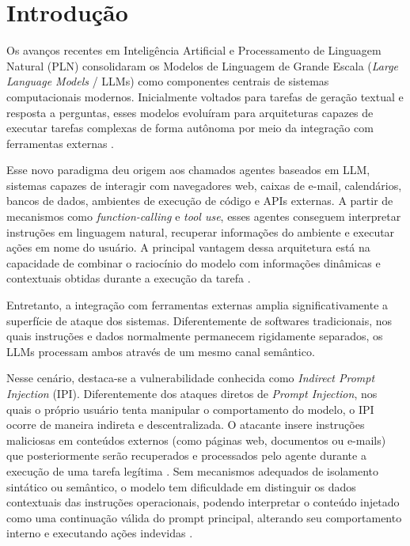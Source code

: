 \chapter{Introdução}\label{chp:INTRODUCAO}

Os avanços recentes em Inteligência Artificial e Processamento de Linguagem Natural (PLN) consolidaram os Modelos de Linguagem de Grande Escala (\textit{Large Language Models} / LLMs) como componentes centrais de sistemas computacionais modernos. Inicialmente voltados para tarefas de geração textual e resposta a perguntas, esses modelos evoluíram para arquiteturas capazes de executar tarefas complexas de forma autônoma por meio da integração com ferramentas externas \cite{debenedetti2024agentdojynamicenvironmentevaluate,ba2026cibercomprehensivebenchmarksecurity}.

Esse novo paradigma deu origem aos chamados agentes baseados em LLM, sistemas capazes de interagir com navegadores web, caixas de e-mail, calendários, bancos de dados, ambientes de execução de código e APIs externas. A partir de mecanismos como \textit{function-calling} e \textit{tool use}, esses agentes conseguem interpretar instruções em linguagem natural, recuperar informações do ambiente e executar ações em nome do usuário. A principal vantagem dessa arquitetura está na capacidade de combinar o raciocínio do modelo com informações dinâmicas e contextuais obtidas durante a execução da tarefa \cite{ferrag2025promptinjectionsprotocolexploits}.

Entretanto, a integração com ferramentas externas amplia significativamente a superfície de ataque dos sistemas. Diferentemente de softwares tradicionais, nos quais instruções e dados normalmente permanecem rigidamente separados, os LLMs processam ambos através de um mesmo canal semântico.

Nesse cenário, destaca-se a vulnerabilidade conhecida como \textit{Indirect Prompt Injection} (IPI). Diferentemente dos ataques diretos de \textit{Prompt Injection}, nos quais o próprio usuário tenta manipular o comportamento do modelo, o IPI ocorre de maneira indireta e descentralizada. O atacante insere instruções maliciosas em conteúdos externos (como páginas web, documentos ou e-mails) que posteriormente serão recuperados e processados pelo agente durante a execução de uma tarefa legítima \cite{greshake2023youvesignedforcompromising,dziemian2026vulnerableaiagentsindirect}. Sem mecanismos adequados de isolamento sintático ou semântico, o modelo tem dificuldade em distinguir os dados contextuais das instruções operacionais, podendo interpretar o conteúdo injetado como uma continuação válida do prompt principal, alterando seu comportamento interno e executando ações indevidas \cite{ferrag2025promptinjectionsprotocolexploits,wallace2024instructionhierarchytrainingllms}.

